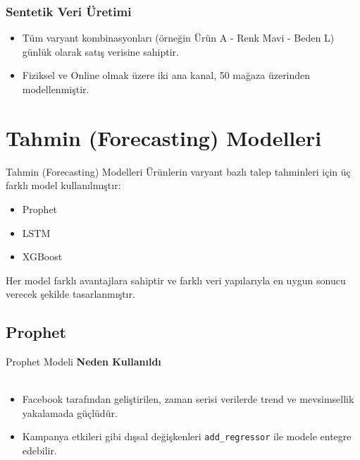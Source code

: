 \documentclass[12pt]{beamer}
\begin{document}
\begin{frame}
	\frametitle{Sentetik Veri Üretimi}
	\begin{itemize}
		\item Tüm varyant kombinasyonları (örneğin Ürün A - Renk Mavi - Beden L) günlük olarak satış verisine sahiptir.
		\item Fiziksel ve Online olmak üzere iki ana kanal, 50 mağaza üzerinden modellenmiştir.
	\end{itemize}  
\end{frame}

\section{Tahmin (Forecasting) Modelleri}
\begin{frame}{Tahmin (Forecasting) Modelleri}
	Ürünlerin varyant bazlı talep tahminleri için üç farklı model kullanılmıştır: 
	\vspace{0.5cm}
	\begin{itemize}
		\item Prophet
		\item LSTM 
		\item XGBoost
	\end{itemize}
	\vspace{0.5cm}
	Her model farklı avantajlara sahiptir ve farklı veri yapılarıyla en uygun sonucu verecek şekilde tasarlanmıştır.
\end{frame}

\subsection{Prophet}
\begin{frame}{Prophet Modeli}
	\textbf{Neden Kullanıldı} \\~\\
	\begin{itemize}
		\item Facebook tarafından geliştirilen, zaman serisi verilerde trend ve mevsimsellik yakalamada güçlüdür.
		\item Kampanya etkileri gibi dışsal değişkenleri \texttt{add\_regressor} ile modele entegre edebilir.
	\end{itemize}
\end{frame}
\end{document}
